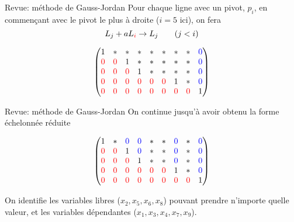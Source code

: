 \documentclass[french, handout]{beamer}
\begin{document}
\begin{frame}{Revue: méthode de Gauss-Jordan}
Pour chaque ligne avec un pivot, $p_i$, en commençant avec le pivot
le plus à droite ($i=5$ ici), on fera
\Large
\[
 L_j + a L_{\color{red}i} \rightarrow L_j \qquad(j <i)
\]
\normalsize
	
\[
\begin{pmatrix}
1 & *  & * & * & * & * & * & * & {\color{blue}{0}} \\
{\color{red}{0}} & {\color{red}{0}} & 1 & * & * & * & * & * & {\color{blue}{0}} \\
{\color{red}{0}} & {\color{red}{0}} & {\color{red}{0}} & 1 & * & * & * & * & {\color{blue}{0}} \\ 
{\color{red}{0}} & {\color{red}{0}} & {\color{red}{0}} & {\color{red}{0}} & {\color{red}{0}} & {\color{red}{0}} & 1 & * & {\color{blue}{0}} \\ 
{\color{red}{0}} & {\color{red}{0}} & {\color{red}{0}} & {\color{red}{0}} & {\color{red}{0}} & {\color{red}{0}} & {\color{red}{0}} & {\color{red}{0}} & 1
\end{pmatrix}
\]	
\end{frame}	
	
	
\begin{frame}{Revue: méthode de Gauss-Jordan}
On continue jusqu'à avoir obtenu la forme échelonnée réduite
	
\[
\begin{pmatrix}
1 & * & {\color{blue}{0}} & {\color{blue}{0}} & * & * & {\color{blue}{0}} & * & {\color{blue}{0}}  \\
{\color{red}{0}} & {\color{red}{0}} & 1 & {\color{blue}{0}} & * & * & {\color{blue}{0}} & * & {\color{blue}{0}}  \\
{\color{red}{0}} & {\color{red}{0}} & {\color{red}{0}} & 1 & * & * & {\color{blue}{0}} & * & {\color{blue}{0}}  \\ 
{\color{red}{0}} & {\color{red}{0}} & {\color{red}{0}} & {\color{red}{0}} & {\color{red}{0}} & {\color{red}{0}} & 1 & * & {\color{blue}{0}}  \\ 
{\color{red}{0}} & {\color{red}{0}} & {\color{red}{0}} & {\color{red}{0}} & {\color{red}{0}} & {\color{red}{0}} & {\color{red}{0}} & {\color{red}{0}} & 1
\end{pmatrix}
\]	
\vfill

On identifie les variables libres ($x_2, x_5, x_6, x_8$) pouvant prendre n'importe quelle valeur, et les variables dépendantes ($x_1, x_3, x_4, x_7, x_9$).
\end{frame}	
		
\end{document}
